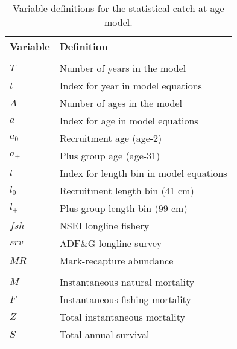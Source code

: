 \documentclass[]{article}
\begin{document}
\begin{table}

\caption{\label{tab:vardefns}Variable definitions for the statistical catch-at-age model.}
\centering
\begin{tabular}[t]{ll}
\toprule
Variable & Definition\\
\midrule
\addlinespace[0.3em]
\multicolumn{2}{l}{\textbf{$\textit{Indexing and model dimensions}$}}\\
\hspace{1em}$T$ & Number of years in the model\\
\hspace{1em}$t$ & Index for year in model equations\\
\hspace{1em}$A$ & Number of ages in the model\\
\hspace{1em}$a$ & Index for age in model equations\\
\hspace{1em}$a_0$ & Recruitment age (age-2)\\
\hspace{1em}$a_{+}$ & Plus group age (age-31)\\
\hspace{1em}$l$ & Index for length bin in model equations\\
\hspace{1em}$l_0$ & Recruitment length bin (41 cm)\\
\hspace{1em}$l_{+}$ & Plus group length bin (99 cm)\\
\hspace{1em}$fsh$ & NSEI longline fishery\\
\hspace{1em}$srv$ & ADF\&G longline survey\\
\hspace{1em}$MR$ & Mark-recapture abundance\\
\addlinespace[0.3em]
\multicolumn{2}{l}{\textbf{$\textit{Parameters}$}}\\
\hspace{1em}$M$ & Instantaneous natural mortality\\
\hspace{1em}$F$ & Instantaneous fishing mortality\\
\hspace{1em}$Z$ & Total instantaneous mortality\\
\hspace{1em}$S$ & Total annual survival\\

\end{tabular}
\end{table}
\end{document}
